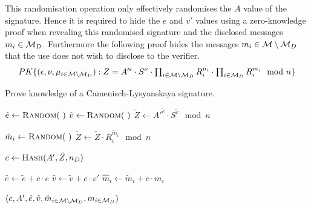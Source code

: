 This randomisation operation only effectively randomises the $A$ value of the
signature. Hence it is required to hide the $e$ and $v'$ values using a
zero-knowledge proof when revealing this randomised signature and the disclosed
messages $m_i \in \mathcal{M}_D$. Furthermore the following proof hides the messages
$m_i \in \mathcal{M} \setminus \mathcal{M}_D$ that the use does not wish to disclose to the
verifier.
\begin{equation*}
  PK\{(\epsilon, \nu, \mu_{i \in \mathcal{M} \setminus \mathcal{M}_D}) :
    Z = A'^{\epsilon} \cdot S^{\nu}
    \cdot \textstyle\prod_{i \in \mathcal{M} \setminus \mathcal{M}_D} R_i^{\mu_i}
    \cdot \textstyle\prod_{i \in \mathcal{M}_D} R_i^{m_i} \mod n \}
\end{equation*}

\begin{algorithm}
  \caption{Prove knowledge of a Camenisch-Lysyanskaya signature.}
  \label{alg:CL-prove-D}
  \addtolength{\baselineskip}{1mm}
  \begin{algorithmic}[1]
      \State $\tilde{e} \gets \Call{Random}{~}$
      \State $\tilde{v} \gets \Call{Random}{~}$
      \State $\tilde{Z} \gets {A'}^{\tilde{e}} \cdot S^{\tilde{v}} \mod n$

        \State $\tilde{m}_i \gets \Call{Random}{~}$
        \State $\tilde{Z} \gets \tilde{Z} \cdot R_i^{\tilde{m}_i} \mod n$
      \EndFor

      \State $c \gets \Call{Hash}{A', \tilde{Z}, n_D}$

      \State $\hat{e} \gets \tilde{e} + c \cdot e$
      \State $\hat{v} \gets \tilde{v} + c \cdot v'$
        \State $\hat{m}_i \gets \tilde{m}_i + c \cdot m_i$
      \EndFor

      \Return $(c, A', \hat{e}, \hat{v}, \hat{m}_{i \in \mathcal{M} \setminus \mathcal{M}_D}, m_{i \in \mathcal{M}_D})$
    \EndFunction
  \end{algorithmic}
\end{algorithm}

